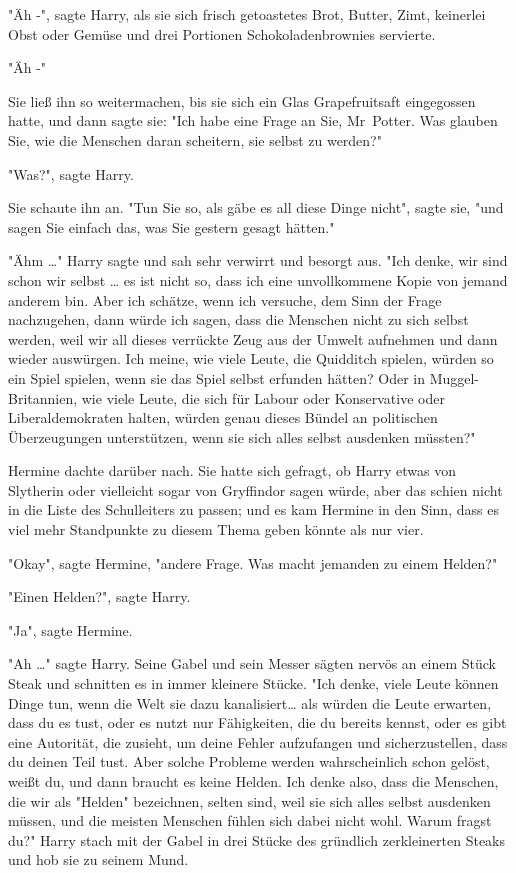 {"Äh -", sagte Harry, als sie sich frisch getoastetes Brot, Butter, Zimt, keinerlei Obst oder Gemüse und drei Portionen Schokoladenbrownies servierte.

"Äh -"

Sie ließ ihn so weitermachen, bis sie sich ein Glas Grapefruitsaft eingegossen hatte, und dann sagte sie: "Ich habe eine Frage an Sie, Mr~Potter. Was glauben Sie, wie die Menschen daran scheitern, sie selbst zu werden?"

"Was?", sagte Harry.

Sie schaute ihn an. "Tun Sie so, als gäbe es all diese Dinge nicht", sagte sie, "und sagen Sie einfach das, was Sie gestern gesagt hätten."

"Ähm …" Harry sagte und sah sehr verwirrt und besorgt aus. "Ich denke, wir sind schon wir selbst … es ist nicht so, dass ich eine unvollkommene Kopie von jemand anderem bin. Aber ich schätze, wenn ich versuche, dem Sinn der Frage nachzugehen, dann würde ich sagen, dass die Menschen nicht zu sich selbst werden, weil wir all dieses verrückte Zeug aus der Umwelt aufnehmen und dann wieder auswürgen. Ich meine, wie viele Leute, die Quidditch spielen, würden so ein Spiel spielen, wenn sie das Spiel selbst erfunden hätten? Oder in Muggel-Britannien, wie viele Leute, die sich für Labour oder Konservative oder Liberaldemokraten halten, würden genau dieses Bündel an politischen Überzeugungen unterstützen, wenn sie sich alles selbst ausdenken müssten?"

Hermine dachte darüber nach. Sie hatte sich gefragt, ob Harry etwas von Slytherin oder vielleicht sogar von Gryffindor sagen würde, aber das schien nicht in die Liste des Schulleiters zu passen; und es kam Hermine in den Sinn, dass es viel mehr Standpunkte zu diesem Thema geben könnte als nur vier.

"Okay", sagte Hermine, "andere Frage. Was macht jemanden zu einem Helden?"

"Einen Helden?", sagte Harry.

"Ja", sagte Hermine.

"Ah …" sagte Harry. Seine Gabel und sein Messer sägten nervös an einem Stück Steak und schnitten es in immer kleinere Stücke. "Ich denke, viele Leute können Dinge tun, wenn die Welt sie dazu kanalisiert… als würden die Leute erwarten, dass du es tust, oder es nutzt nur Fähigkeiten, die du bereits kennst, oder es gibt eine Autorität, die zusieht, um deine Fehler aufzufangen und sicherzustellen, dass du deinen Teil tust. Aber solche Probleme werden wahrscheinlich schon gelöst, weißt du, und dann braucht es keine Helden. Ich denke also, dass die Menschen, die wir als "Helden" bezeichnen, selten sind, weil sie sich alles selbst ausdenken müssen, und die meisten Menschen fühlen sich dabei nicht wohl. Warum fragst du?" Harry stach mit der Gabel in drei Stücke des gründlich zerkleinerten Steaks und hob sie zu seinem Mund.

}
